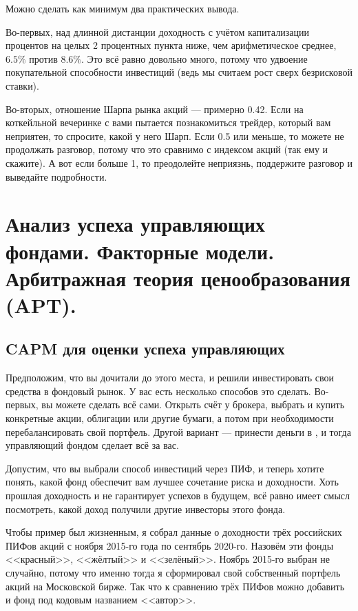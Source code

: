 Можно сделать как минимум два практических вывода.

Во-первых, над длинной дистанции доходность с учётом капитализации процентов
на целых 2 процентных пункта ниже, чем арифметическое среднее, $6.5\%$ против $8.6\%$. Это всё равно довольно много, потому что удвоение покупательной способности инвестиций (ведь мы считаем рост сверх безрисковой ставки).

Во-вторых, отношение Шарпа рынка акций --- примерно 0.42. Если на коткейльной
вечеринке с вами пытается познакомиться трейдер, который вам неприятен, то спросите, какой у него Шарп. Если 0.5 или меньше, то можете не продолжать разговор, потому что это сравнимо с индексом акций (так ему и скажите). А вот если больше 1, то преодолейте неприязнь, поддержите разговор и выведайте подробности.


\section{Анализ успеха управляющих фондами. Факторные модели. Арбитражная 
теория ценообразования (APT).}

\subsection{CAPM для оценки успеха управляющих}

Предположим, что вы дочитали до этого места, и решили инвестировать свои средства в фондовый рынок. У вас есть несколько способов это сделать. Во-первых, вы можете сделать всё сами. Открыть счёт у брокера, выбрать и купить конкретные акции, облигации или другие бумаги, а потом при необходимости перебалансировать свой портфель. Другой вариант --- принести деньги в , и тогда управляющий фондом сделает всё за вас.

Допустим, что вы выбрали способ инвестиций через ПИФ, и теперь хотите понять, какой фонд обеспечит вам лучшее сочетание риска и доходности. Хоть прошлая доходность и не гарантирует успехов в будущем, всё равно имеет смысл посмотреть, какой доход получили другие инвесторы этого фонда.

Чтобы пример был жизненным, я собрал данные о доходности трёх российских ПИФов акций с ноября 2015-го года по сентябрь 2020-го. Назовём эти фонды <<красный>>, <<жёлтый>> и <<зелёный>>. Ноябрь 2015-го выбран не случайно, потому что именно тогда я сформировал свой собственный портфель акций на Московской бирже. Так что к сравнению трёх ПИФов можно добавить и фонд под кодовым названием <<автор>>.

